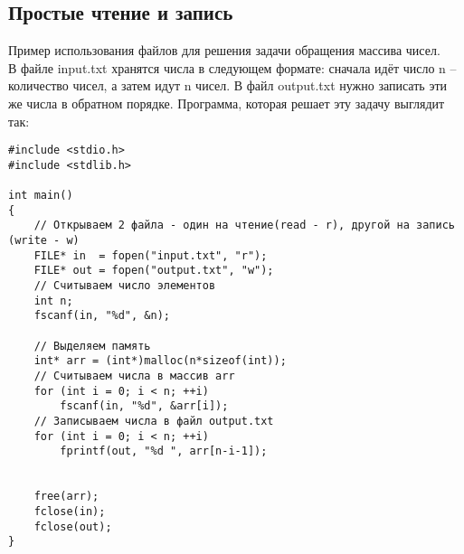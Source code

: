 \documentclass{article}
\begin{document}



\subsection*{Простые чтение и запись}

Пример использования файлов для решения задачи обращения массива чисел. \\
В файле input.txt хранятся числа в следующем формате: сначала идёт число n -- количество чисел, а затем идут n чисел. В файл output.txt нужно записать эти же числа в обратном порядке. Программа, которая решает эту задачу выглядит так:
\begin{lstlisting}
#include <stdio.h>
#include <stdlib.h>

int main()
{
    // Открываем 2 файла - один на чтение(read - r), другой на запись (write - w)
    FILE* in  = fopen("input.txt", "r");
    FILE* out = fopen("output.txt", "w");
    // Считываем число элементов
    int n;
    fscanf(in, "%d", &n);

    // Выделяем память
    int* arr = (int*)malloc(n*sizeof(int));
    // Считываем числа в массив arr
    for (int i = 0; i < n; ++i)
        fscanf(in, "%d", &arr[i]);
    // Записываем числа в файл output.txt
    for (int i = 0; i < n; ++i)
	    fprintf(out, "%d ", arr[n-i-1]);


    free(arr);
    fclose(in);
    fclose(out);
}
\end{lstlisting}
\end{document}
